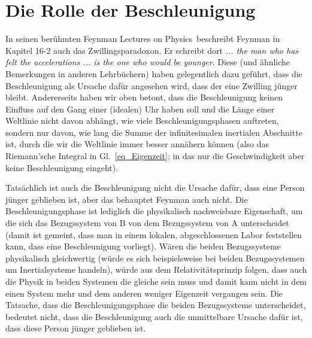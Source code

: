 \section{Die Rolle der Beschleunigung}

In seinen ber\"uhmten \glqq Feynman Lectures on Physics\grqq\ beschreibt 
Feynman in
Kapitel 16-2 auch das Zwillingsparadoxon. Er schreibt dort \textit{... the man who has felt
the accelerations ... is the one who would be younger}. Diese (und \"ahnliche Bemerkungen
in anderen Lehrb\"uchern) haben gelegentlich dazu gef\"uhrt, dass die Beschleunigung als Ursache
daf\"ur angesehen wird, dass der eine Zwilling j\"unger bleibt. Andererseits haben wir oben
betont, dass die Beschleunigung keinen Einfluss auf den Gang einer (idealen) Uhr haben soll
und die L\"ange einer Weltlinie nicht davon abh\"angt, wie viele Beschleunigungsphasen
auftreten, sondern nur davon, wie lang die Summe der infinitesimalen inertialen Abschnitte
ist, durch die wir die Weltlinie immer besser ann\"ahern k\"onnen (also das Riemann'sche
Integral in Gl.\ \ref{eq_Eigenzeit}; in das nur die Geschwindigkeit aber keine
Beschleunigung eingeht). 

Tats\"achlich ist auch die Beschleunigung nicht die Ursache daf\"ur, dass eine Person
j\"unger geblieben ist, aber das behauptet Feynman auch nicht. Die Beschleunigungsphase
ist lediglich die physikalisch nachweisbare Eigenschaft, um die sich das Bezugs\-sys\-tem von B von dem 
Bezugssystem von A unterscheidet (damit ist gemeint, dass man in einem lokalen,
abgeschlossenen Labor feststellen kann, dass eine Beschleunigung vorliegt). W\"aren die beiden Bezugssysteme
physikalisch gleichwertig (w\"urde es sich beispielsweise bei beiden Bezugssystemen um 
Inertialsysteme handeln), w\"urde aus dem Relativit\"atsprinzip folgen, dass auch die Physik in
beiden Systemen die gleiche sein muss und damit kann nicht in dem einen System mehr und dem anderen
weniger Eigenzeit vergangen sein. Die Tatsache, dass die Beschleunigungsphase die beiden
Bezugs\-sys\-teme unterscheidet, bedeutet nicht, dass die Beschleunigung auch die unmittelbare
Ursache daf\"ur ist, dass diese Person j\"unger geblieben ist.

